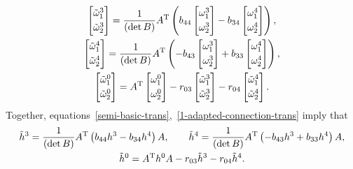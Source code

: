 \documentclass[10pt,a4paper]{amsart}
\numberwithin{equation}{section}
\theoremstyle{definition}
\begin{document}
\begin{gather}
\begin{bmatrix}
\tilde{\omega}^3_1
\vspace{1mm}\\
\tilde{\omega}^3_2
\end{bmatrix}
= \frac{1}{(\det B)} A^{\rm T} \left(b_{44}
\begin{bmatrix}
\omega^3_1
\vspace{1mm}\\
\omega^3_2
\end{bmatrix}
- b_{34}
\begin{bmatrix}
\omega^4_1
\vspace{1mm}\\
\omega^4_2
\end{bmatrix}
\right),
\nonumber
\\
\begin{bmatrix}
\tilde{\omega}^4_1
\vspace{1mm}\\
\tilde{\omega}^4_2
\end{bmatrix}
= \frac{1}{(\det B)} A^{\rm T} \left(-b_{43}
\begin{bmatrix}
\omega^3_1
\vspace{1mm}\\
\omega^3_2
\end{bmatrix}
+ b_{33}
\begin{bmatrix}
\omega^4_1
\vspace{1mm}\\
\omega^4_2
\end{bmatrix}
\right),
\nonumber
\\
\begin{bmatrix}
\tilde{\omega}^0_1
\vspace{1mm}\\
\tilde{\omega}^0_2
\end{bmatrix}
= A^{\rm T}
\begin{bmatrix}
\omega^0_1
\vspace{1mm}\\
\omega^0_2
\end{bmatrix}
- r_{03}
\begin{bmatrix}
\tilde{\omega}^3_1
\vspace{1mm}\\
\tilde{\omega}^3_2
\end{bmatrix}
- r_{04}
\begin{bmatrix}
\tilde{\omega}^4_1
\vspace{1mm}\\
\tilde{\omega}^4_2
\end{bmatrix}.
\label{1-adapted-connection-trans}
\end{gather}
Together, equations~\eqref{semi-basic-trans},~\eqref{1-adapted-connection-trans} imply that
\begin{gather}
\tilde{h}^3 = \frac{1}{(\det B)} A^{\rm T} \left(b_{44} h^3 - b_{34} h^4 \right) A,
\qquad
\tilde{h}^4 = \frac{1}{(\det B)} A^{\rm T} \left(-b_{43} h^3 + b_{33} h^4 \right) A,
\nonumber
\\
\tilde{h}^0 = A^{\rm T} h^0 A-r_{03} \tilde{h}^3 - r_{04} \tilde{h}^4.
\label{1-adapted-group-action}
\end{gather}
\end{document}
